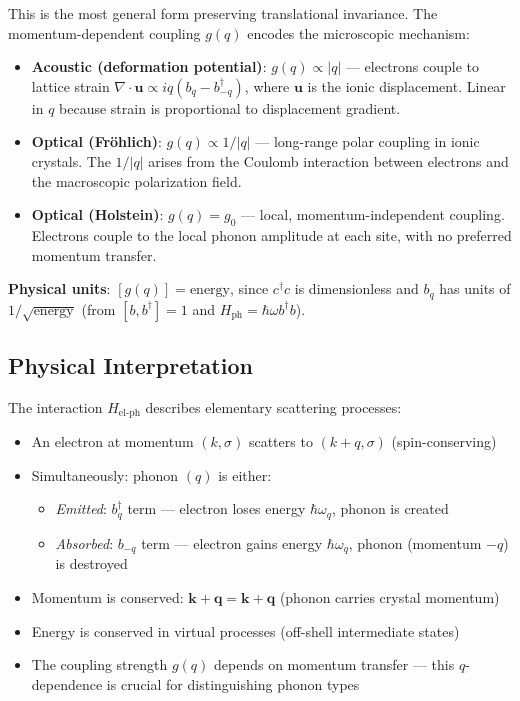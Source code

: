 \documentclass[12pt]{article}
\begin{document}
This is the most general form preserving translational invariance. The momentum-dependent coupling $g(q)$ encodes the microscopic mechanism:
\begin{itemize}
\item \textbf{Acoustic (deformation potential)}: $g(q) \propto |q|$ — electrons couple to lattice strain $\nabla \cdot \mathbf{u} \propto iq(b_q - b^\dagger_{-q})$, where $\mathbf{u}$ is the ionic displacement. Linear in $q$ because strain is proportional to displacement gradient.
\item \textbf{Optical (Fr\"ohlich)}: $g(q) \propto 1/|q|$ — long-range polar coupling in ionic crystals. The $1/|q|$ arises from the Coulomb interaction between electrons and the macroscopic polarization field.
\item \textbf{Optical (Holstein)}: $g(q) = g_0$ — local, momentum-independent coupling. Electrons couple to the local phonon amplitude at each site, with no preferred momentum transfer.
\end{itemize}

\textbf{Physical units}: $[g(q)] = \text{energy}$, since $c^\dagger c$ is dimensionless and $b_q$ has units of $1/\sqrt{\text{energy}}$ (from $[b,b^\dagger]=1$ and $H_{\text{ph}} = \hbar\omega b^\dagger b$).

\subsection{Physical Interpretation}

The interaction $H_{\text{el-ph}}$ describes elementary scattering processes:
\begin{itemize}
\item An electron at momentum $(k,\sigma)$ scatters to $(k+q,\sigma)$ (spin-conserving)
\item Simultaneously: phonon $(q)$ is either:
  \begin{itemize}
  \item \textit{Emitted}: $b^\dagger_q$ term — electron loses energy $\hbar\omega_q$, phonon is created
  \item \textit{Absorbed}: $b_{-q}$ term — electron gains energy $\hbar\omega_q$, phonon (momentum $-q$) is destroyed
  \end{itemize}
\item Momentum is conserved: $\mathbf{k} + \mathbf{q} = \mathbf{k} + \mathbf{q}$ (phonon carries crystal momentum)
\item Energy is conserved in virtual processes (off-shell intermediate states)
\item The coupling strength $g(q)$ depends on momentum transfer — this $q$-dependence is crucial for distinguishing phonon types
\end{itemize}
\end{document}
